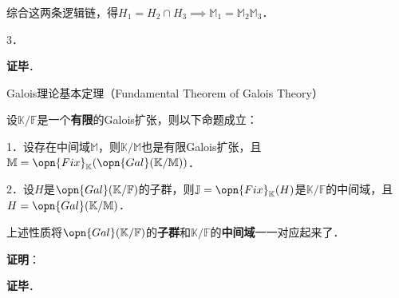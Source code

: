 综合这两条逻辑链，得$H_1=H_2\cap H_3 \implies \mathbb{M}_1=\mathbb{M}_2\mathbb{M}_3$．


3．




\textbf{证毕}．














\begin{theorem}{Galois理论基本定理（Fundamental Theorem of Galois Theory）}

设$\mathbb{K}/\mathbb{F}$是一个\textbf{有限}的Galois扩张，则以下命题成立：

1．设存在中间域$\mathbb{M}$，则$\mathbb{K}/\mathbb{M}$也是有限Galois扩张，且$\mathbb{M}=\opn{Fix}_\mathbb{K}(\opn{Gal}(\mathbb{K}/\mathbb{M}))$．

2．设$H$是$\opn{Gal}(\mathbb{K}/\mathbb{F})$的子群，则$\mathbb{J}=\opn{Fix}_\mathbb{K}(H)$是$\mathbb{K}/\mathbb{F}$的中间域，且$H=\opn{Gal}(\mathbb{K}/\mathbb{M})$．

上述性质将$\opn{Gal}(\mathbb{K}/\mathbb{F})$的\textbf{子群}和$\mathbb{K}/\mathbb{F}$的\textbf{中间域}一一对应起来了．

\end{theorem}

\textbf{证明}：



\textbf{证毕}．


















